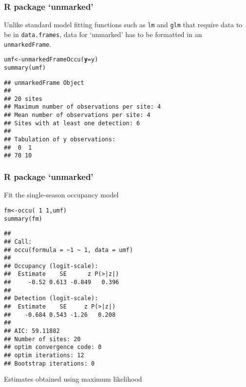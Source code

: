 \documentclass[color=usenames,dvipsnames,handout]{beamer}\usepackage[]{graphicx}\usepackage[]{xcolor}
\makeatletter
\newcommand{\hlnum}[1]{\textcolor[rgb]{0.69,0.494,0}{#1}}%
\newcommand{\hlopt}[1]{\textcolor[rgb]{0,0,0}{#1}}%
\newcommand{\hldef}[1]{\textcolor[rgb]{0,0,0}{#1}}%
\newcommand{\hlkwb}[1]{\textcolor[rgb]{0,0.341,0.682}{#1}}%
\newcommand{\hlkwc}[1]{\textcolor[rgb]{0,0,0}{\textbf{#1}}}%
\newcommand{\hlkwd}[1]{\textcolor[rgb]{0.004,0.004,0.506}{#1}}%
\newenvironment{kframe}{%
 \def\at@end@of@kframe{}%
 \ifinner\ifhmode%
  \def\at@end@of@kframe{\end{minipage}}%
  \begin{minipage}{\columnwidth}%
 \fi\fi%
 \def\FrameCommand##1{\hskip\@totalleftmargin \hskip-\fboxsep
 \colorbox{shadecolor}{##1}\hskip-\fboxsep
     \hskip-\linewidth \hskip-\@totalleftmargin \hskip\columnwidth}%
 \MakeFramed {\advance\hsize-\width
   \@totalleftmargin\z@ \linewidth\hsize
   \@setminipage}}%
 {\par\unskip\endMakeFramed%
 \at@end@of@kframe}
\newenvironment{knitrout}{}{} %
\newcommand{\inr}[1]{\colorbox{inlinecolor}{\texttt{#1}}}
\makeatother
\begin{document}
\begin{frame}[fragile]
  \frametitle{R package `unmarked'}
  Unlike standard model fitting functions such as \inr{lm} and \inr{glm} 
  that require data to be in \texttt{data.frames}, data for `unmarked'
  has to be formatted in an \inr{unmarkedFrame}.
\begin{knitrout}\small
{}\color{fgcolor}\begin{kframe}
\begin{alltt}
\hldef{umf} \hlkwb{<-} \hlkwd{unmarkedFrameOccu}\hldef{(}\hlkwc{y}\hldef{=y)}
\hlkwd{summary}\hldef{(umf)}
\end{alltt}
\begin{verbatim}
## unmarkedFrame Object
## 
## 20 sites
## Maximum number of observations per site: 4 
## Mean number of observations per site: 4 
## Sites with at least one detection: 6 
## 
## Tabulation of y observations:
##  0  1 
## 70 10
\end{verbatim}
\end{kframe}
\end{knitrout}
\end{frame}





\begin{frame}[fragile]
  \frametitle{R package `unmarked'}
  \small
Fit the single-season occupancy model
\begin{knitrout}\scriptsize
{}\color{fgcolor}\begin{kframe}
\begin{alltt}
\hldef{fm} \hlkwb{<-} \hlkwd{occu}\hldef{(}\hlopt{~}\hlnum{1} \hlopt{~}\hlnum{1}\hldef{, umf)}
\hlkwd{summary}\hldef{(fm)}
\end{alltt}
\begin{verbatim}
## 
## Call:
## occu(formula = ~1 ~ 1, data = umf)
## 
## Occupancy (logit-scale):
##  Estimate    SE      z P(>|z|)
##     -0.52 0.613 -0.849   0.396
## 
## Detection (logit-scale):
##  Estimate    SE     z P(>|z|)
##    -0.684 0.543 -1.26   0.208
## 
## AIC: 59.11882 
## Number of sites: 20
## optim convergence code: 0
## optim iterations: 12 
## Bootstrap iterations: 0
\end{verbatim}
\end{kframe}
\end{knitrout}
Estimates obtained using maximum likelihood
\end{frame}
\end{document}
